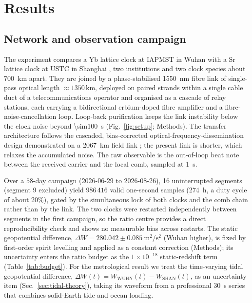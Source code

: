 \documentclass[11pt,a4paper]{article}
\newcommand{\dW}{\Delta W}
\newcommand{\e}[1]{\times 10^{#1}}
\begin{document}


\section{Results}

\subsection{Network and observation campaign}
\label{sec:network}

The experiment compares a Yb lattice clock at IAPMST in Wuhan
\citep{zhu2026yb} with a Sr lattice clock at USTC in Shanghai
\citep{jia2026sr}, two institutions and two clock
species about \qty{700}{km} apart. They are joined by a phase-stabilised
\qty{1550}{nm} fibre link of single-pass optical length $\approx1350$\,km,
deployed on paired strands within a single cable duct of a
telecommunications operator and organised as a cascade of relay stations,
each carrying a bidirectional erbium-doped fibre amplifier and a
fibre-noise-cancellation loop. Loop-back purification keeps the link
instability below the clock noise beyond \qty{\sim100}{s}
(Fig.~\ref{fig:setup}; Methods). The transfer architecture follows the
cascaded, bias-corrected optical-frequency-dissemination design
demonstrated on a \qty{2067}{km} field link \citep{chen2026dissemination}; the
present link is shorter, which relaxes the accumulated noise. The raw
observable is the out-of-loop beat note between the received carrier and
the local comb, sampled at \qty{1}{s}.

{\sloppy
Over a $58$-day campaign (2026-06-29 to 2026-08-26), 16 uninterrupted
segments (segment 9 excluded) yield $986\,416$ valid one-second samples
(\qty{274}{h}, a duty cycle of about $20\%$), gated by the simultaneous lock of both clocks
and the comb chain rather than by the link. The two clocks were
restarted independently between segments in the first campaign, so the
ratio centre provides a direct reproducibility check and shows no
measurable bias across restarts. The static geopotential difference,
$\dW = 280.042\pm0.085\ \mathrm{m^{2}/s^{2}}$ (Wuhan higher), is fixed
by first-order spirit levelling and applied as a constant correction
(Methods); its uncertainty enters the ratio budget as the $1\e{-18}$
static-redshift term (Table~\ref{tab:budget}). For the metrological
result we treat the time-varying tidal geopotential difference,
$\dW(t) = W_{\mathrm{WUHN}}(t) - W_{\mathrm{SHAN}}(t)$, as an
uncertainty item (Sec.~\ref{sec:tidal-theory}), taking its waveform
from a professional \qty{30}{s} series that combines solid-Earth tide and
ocean loading.
\par}
\end{document}
